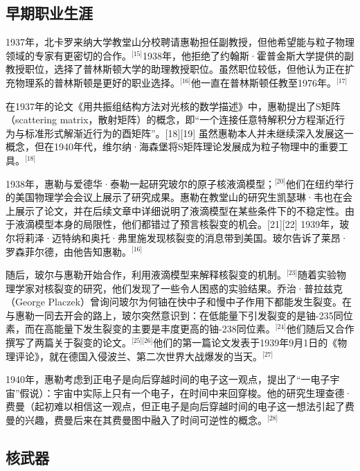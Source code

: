 \subsection{早期职业生涯}
1937年，北卡罗来纳大学教堂山分校聘请惠勒担任副教授，但他希望能与粒子物理领域的专家有更密切的合作。\(^\text{[15]}\)1938年，他拒绝了约翰斯·霍普金斯大学提供的副教授职位，选择了普林斯顿大学的助理教授职位。虽然职位较低，但他认为正在扩充物理系的普林斯顿是更好的职业选择。\(^\text{[16]}\)他一直在普林斯顿任教至1976年。\(^\text{[17]}\)

在1937年的论文《用共振组结构方法对光核的数学描述》中，惠勒提出了S矩阵（scattering matrix，散射矩阵）的概念，即“一个连接任意特解积分方程渐近行为与标准形式解渐近行为的酉矩阵”。[18][19] 虽然惠勒本人并未继续深入发展这一概念，但在1940年代，维尔纳·海森堡将S矩阵理论发展成为粒子物理中的重要工具。\(^\text{[18]}\)

1938年，惠勒与爱德华·泰勒一起研究玻尔的原子核液滴模型；\(^\text{[20]}\)他们在纽约举行的美国物理学会会议上展示了研究成果。惠勒在教堂山的研究生凯瑟琳·韦也在会上展示了论文，并在后续文章中详细说明了液滴模型在某些条件下的不稳定性。由于液滴模型本身的局限性，他们都错过了预言核裂变的机会。[21][22] 1939年，玻尔将莉泽·迈特纳和奥托·弗里施发现核裂变的消息带到美国。玻尔告诉了莱昂·罗森菲尔德，由他告知惠勒。\(^\text{[16]}\)

随后，玻尔与惠勒开始合作，利用液滴模型来解释核裂变的机制。\(^\text{[23]}\)随着实验物理学家对核裂变的研究，他们发现了一些令人困惑的实验结果。乔治·普拉兹克（George Placzek）曾询问玻尔为何铀在快中子和慢中子作用下都能发生裂变。在与惠勒一同去开会的路上，玻尔突然意识到：在低能量下引发裂变的是铀-235同位素，而在高能量下发生裂变的主要是丰度更高的铀-238同位素。\(^\text{[24]}\)他们随后又合作撰写了两篇关于裂变的论文。\(^\text{[25][26]}\)他们的第一篇论文发表于1939年9月1日的《物理评论》，就在德国入侵波兰、第二次世界大战爆发的当天。\(^\text{[27]}\)

1940年，惠勒考虑到正电子是向后穿越时间的电子这一观点，提出了“一电子宇宙”假说）：宇宙中实际上只有一个电子，在时间中来回穿梭。他的研究生理查德·费曼（起初难以相信这一观点，但正电子是向后穿越时间的电子这一想法引起了费曼的兴趣，费曼后来在其费曼图中融入了时间可逆性的概念。\(^\text{[28]}\)
\subsection{核武器}
